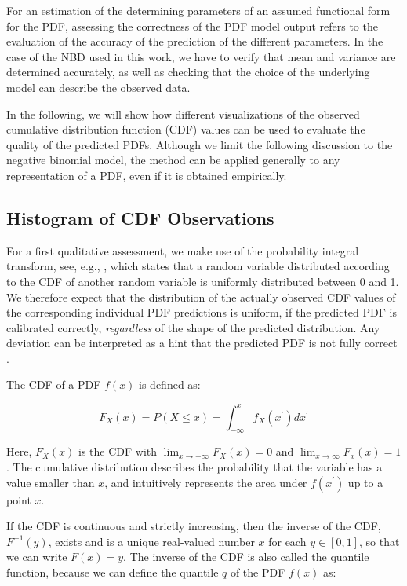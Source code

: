 \documentclass[BCOR=1mm, DIV=calc,10pt,
twoside=true,
twocolumn,
headings=normal]{scrartcl}
\begin{document}
For an estimation of the determining parameters of an assumed functional form for the PDF, assessing the correctness of the PDF model output refers to the evaluation of the accuracy of the prediction of the different parameters. In the case of the NBD used in this work, we have to verify that mean and variance are determined accurately, as well as checking that the choice of the underlying model can describe the observed data.

In the following, we will show how different visualizations of the observed cumulative distribution function (CDF) values can be used to evaluate the quality of the predicted PDFs. Although we limit the following discussion to the negative binomial model, the method can be applied generally to any representation of a PDF, even if it is obtained empirically.

\subsection{Histogram of CDF Observations}
\label{sec:cdf_histo}

For a first qualitative assessment, we make use of the probability integral transform, see, e.g., \cite{Angus1994,casella2002statistical}, which states that a random variable distributed according to the CDF of another random variable is uniformly distributed between 0 and 1. We therefore expect that the distribution of the actually observed CDF values of the corresponding individual PDF predictions is uniform, if the predicted PDF is calibrated correctly, {\em regardless} of the shape of the predicted distribution. Any deviation can be interpreted as a hint that the predicted PDF is not fully correct \cite{diebold1998vevaluating}.

\noindent
The CDF of a PDF $f(x)$ is defined as:

\begin{equation}
\label{eqn:CDF}
F_X(x) = P(X \le x) = \int_{-\infty}^{x} f_X(x^\prime) dx^\prime
\end{equation}

Here, $F_X(x)$ is the CDF with $\lim_{x \to -\infty}F_X(x) = 0$ and $\lim_{x \to \infty}F_x(x) = 1$. The cumulative distribution describes the probability that the variable has a value smaller than $x$, and intuitively represents the area under $f(x^\prime)$ up to a point $x$.

If the CDF is continuous and strictly increasing, then the inverse of the CDF, $F^{-1}(y)$, exists and is a unique real-valued number $x$ for each $y \in [0,1]$, so that we can write $F(x) = y$. The inverse of the CDF is also called the quantile function, because we can define the quantile $q$ of the PDF $f(x)$ as:
\end{document}
